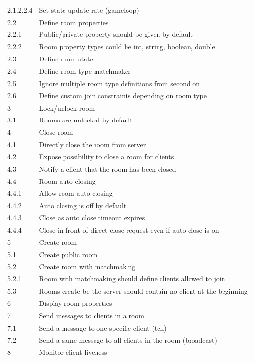\begin{center}
\begin{longtable}{|l|l|}
2.1.2.2.4 & Set state update rate (gameloop) \\
2.2       & Define room properties\\
2.2.1     & Public/private property should be given by default \\
2.2.2     & Room property types could be int, string, boolean, double \\ 
2.3       & Define room state \\
2.4       & Define room type matchmaker \\
2.5       & Ignore multiple room type definitions from second on \\
2.6       & Define custom join constraints depending on room type \\
3         & Lock/unlock room \\
3.1       & Rooms are unlocked by default \\
4         & Close room \\
4.1       & Directly close the room from server \\
4.2       & Expose possibility to close a room for clients \\
4.3       & Notify a client that the room has been closed \\
4.4       & Room auto closing \\
4.4.1     & Allow room auto closing \\
4.4.2     & Auto closing is off by default \\
4.4.3     & Close as auto close timeout expires \\
4.4.4     & Close in front of direct close request even if auto close is on \\
5         & Create room \\
5.1       & Create public room \\
5.2       & Create room with matchmaking \\
5.2.1     & Room with matchmaking should define clients allowed to join \\
5.3       & Rooms create be the server should contain no client at the beginning \\
6        & Display room properties \\
7        & Send messages to clients in a room \\
7.1      & Send a message to one specific client (tell) \\
7.2      & Send a same message to all clients in the room (broadcast) \\
8        & Monitor client liveness \\

\end{longtable}
\end{center}
